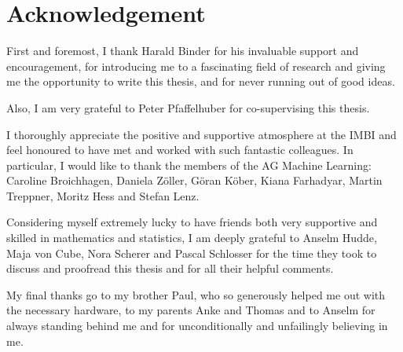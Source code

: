 \chapter*{Acknowledgement}

First and foremost, I thank Harald Binder for his invaluable support and encouragement, for introducing me to a fascinating field of research and giving me the opportunity to write this thesis, and for never running out of good ideas. 

Also, I am very grateful to Peter Pfaffelhuber for co-supervising this thesis. 

I thoroughly appreciate the positive and supportive atmosphere at the IMBI and feel honoured to have met and worked with such fantastic colleagues.
In particular, I would like to thank the members of the AG Machine Learning: 
Caroline Broichhagen, Daniela Zöller, Göran Köber, Kiana Farhadyar, Martin Treppner, Moritz Hess and Stefan Lenz. 

Considering myself extremely lucky to have friends both very supportive and skilled in mathematics and statistics, I am deeply grateful to Anselm Hudde, Maja von Cube, Nora Scherer and Pascal Schlosser for the time they took to discuss and proofread this thesis and for all their helpful comments. 

My final thanks go to my brother Paul, who so generously helped me out with the necessary hardware, to my parents Anke and Thomas and to Anselm for always standing behind me and for unconditionally and unfailingly believing in me. 
